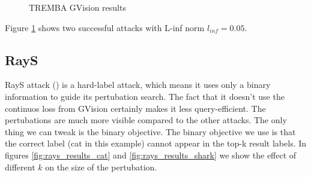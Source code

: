\begin{figure}
\centering
 \hfill

\caption{TREMBA GVision results}
\label{fig:tremba_gvision_results}
\end{figure}

Figure \ref{fig:tremba_gvision_results} shows two successful attacks with L-inf norm $l_{inf} = 0.05$.

\subsection{RayS}
\label{rays_poc}

RayS attack (\cite{Chen2020RaySAR}) is a hard-label attack, which means it uses only a binary information to guide its pertubation search. The fact that it doesn't use the continuos loss from GVision certainly makes it less query-efficient. The pertubations are much more visible compared to the other attacks. The only thing we can tweak is the binary objective. The binary objective we use is that the correct label (cat in this example) cannot appear in the top-k result labels. In figures \ref{fig:rays_results_cat} and \ref{fig:rays_results_shark} we show the effect of different $k$ on the size of the pertubation.


